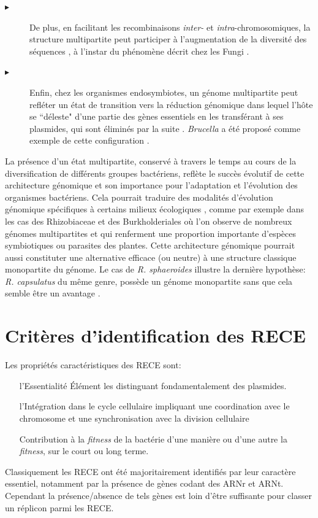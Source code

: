 \begin{description}
	\item[$\blacktriangleright$] De plus, en facilitant les recombinaisons \textit{inter-} et \textit{intra}-chromosomiques, la structure multipartite peut participer à l'augmentation de la diversité des séquences \citep{Mackenzie2004}, à l'instar du phénomène décrit chez les Fungi \citep{Croll2012}.
	\item[$\blacktriangleright$] Enfin, chez les organismes endosymbiotes, un génome multipartite peut refléter un état de transition vers la réduction génomique dans lequel l'hôte se ``déleste"  d'une partie des gènes essentiels en les transférant à ses plasmides, qui sont éliminés par la suite \citep{Moreno1998}. \textit{Brucella} a été proposé comme exemple de cette configuration \citep{Wattam2009}.
\end{description}	

	La présence d'un état multipartite, conservé à travers le temps au cours de la diversification de différents groupes bactériens, reflète le succès évolutif de cette architecture génomique et son importance pour l'adaptation et l'évolution des organismes bactériens. Cela pourrait traduire des modalités d'évolution génomique spécifiques à certains milieux écologiques \citep{Slater2009}, comme par exemple dans les cas des Rhizobiaceae et des Burkholderiales où l'on observe de nombreux génomes multipartites et qui renferment une proportion importante d'espèces symbiotiques ou parasites des plantes. Cette architecture génomique pourrait aussi constituter une alternative efficace (ou neutre) à une structure classique monopartite du génome. Le cas de \textit{R. sphaeroides} illustre la dernière hypothèse: \textit{R. capsulatus} du même genre, possède un génome monopartite sans que cela semble être un avantage \citep{tichi2001interactive,Choudhary2007}. 
      
   
\section{Critères d'identification des RECE}\label{chrIIrece}
	Les propriétés caractéristiques des RECE sont:
\begin{itemize}
	\item[l'Essentialité] Élément les distinguant fondamentalement des plasmides.
	\item[l'Intégration dans le cycle cellulaire] impliquant une coordination avec le chromosome et une synchronisation avec la division cellulaire
	\item[Contribution à la \textit{fitness} de la bactérie] d'une manière ou d'une autre la \textit{fitness}, sur le court ou long terme.
\end{itemize}
	Classiquement les RECE ont été majoritairement identifiés par leur caractère essentiel, notamment par la présence de gènes codant des ARNr et ARNt. Cependant la présence/absence de tels gènes est loin d'être suffisante pour classer un réplicon parmi les RECE.
	
